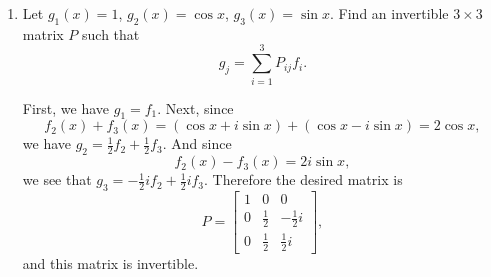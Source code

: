 \begin{enumerate}
\begin{proof}
    Since it is necessary that $c_1 = c_2 = c_3 = 0$, it follows that
    $\{f_1,f_2,f_3\}$ is a linearly independent set.
  \end{proof}
\item Let $g_1(x) = 1$, $g_2(x) = \cos x$, $g_3(x) = \sin x$. Find an
  invertible $3\times3$ matrix $P$ such that
  \begin{equation*}
    g_j = \sum_{i=1}^3 P_{ij}f_i.
  \end{equation*}
  \begin{solution}
    First, we have $g_1 = f_1$. Next, since
    \begin{equation*}
      f_2(x) + f_3(x) = (\cos x + i\sin x) + (\cos x - i\sin x)
      = 2\cos x,
    \end{equation*}
    we have $g_2 = \frac12f_2 + \frac12f_3$. And since
    \begin{equation*}
      f_2(x) - f_3(x) = 2i\sin x,
    \end{equation*}
    we see that $g_3 = -\frac12if_2 + \frac12if_3$. Therefore the
    desired matrix is
    \begin{equation*}
      P =
      \begin{bmatrix}
        1 & 0 & 0 \\[3pt]
        0 & \frac12 & -\frac12i \\[3pt]
        0 & \frac12 & \frac12i
      \end{bmatrix},
    \end{equation*}
    and this matrix is invertible.
  \end{solution}
\end{enumerate}

